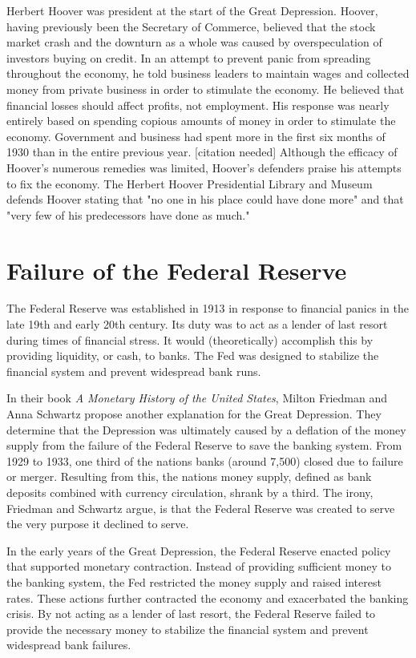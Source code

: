 \documentclass{article}
\begin{document}
Herbert Hoover was president at the start of the Great Depression. Hoover,
having previously been the Secretary of Commerce, believed that the stock
market crash and the downturn as a whole was caused by overspeculation of
investors buying on credit. In an attempt to prevent panic from spreading
throughout the economy, he told business leaders to maintain wages and
collected money from private business in order to stimulate the economy. He
believed that financial losses should affect profits, not employment. His
response was nearly entirely based on spending copious amounts of money in
order to stimulate the economy. Government and business had spent more in the
first six months of 1930 than in the entire previous year. [citation needed]
Although the efficacy of Hoover's numerous remedies was limited, Hoover's
defenders praise his attempts to fix the economy. The Herbert Hoover
Presidential Library and Museum defends Hoover stating that "no one in his
place could have done more" and that "very few of his predecessors have done as
much."

\section{Failure of the Federal Reserve}

The Federal Reserve was established in 1913 in response to financial panics in
the late 19th and early 20th century. Its duty was to act as a lender of last
resort during times of financial stress. It would (theoretically) accomplish
this by providing liquidity, or cash, to banks. The Fed was designed to stabilize
the financial system and prevent widespread bank runs.

In their book \textit{A Monetary History of the United States}, Milton Friedman
and Anna Schwartz propose another explanation for the Great Depression. They
determine that the Depression was ultimately caused by a deflation of the money
supply from the failure of the Federal Reserve to save the banking system. From
1929 to 1933, one third of the nations banks (around 7,500) closed due to
failure or merger. Resulting from this, the nations money supply, defined as
bank deposits combined with currency circulation, shrank by a third. The irony,
Friedman and Schwartz argue, is that the Federal Reserve was created to serve
the very purpose it declined to serve.

In the early years of the Great Depression, the Federal Reserve enacted policy
that supported monetary contraction. Instead of providing sufficient money to
the banking system, the Fed restricted the money supply and raised interest
rates. These actions further contracted the economy and exacerbated the banking
crisis. By not acting as a lender of last resort, the Federal Reserve failed to
provide the necessary money to stabilize the financial system and prevent
widespread bank failures.
\end{document}
